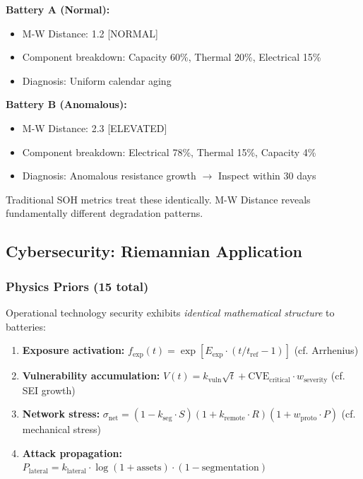 \documentclass[11pt,a4paper]{article}
\begin{document}
\textbf{Battery A (Normal):}
\begin{itemize}
\item M-W Distance: 1.2 [NORMAL]
\item Component breakdown: Capacity 60\%, Thermal 20\%, Electrical 15\%
\item Diagnosis: Uniform calendar aging
\end{itemize}

\textbf{Battery B (Anomalous):}
\begin{itemize}
\item M-W Distance: 2.3 [ELEVATED]
\item Component breakdown: Electrical 78\%, Thermal 15\%, Capacity 4\%
\item Diagnosis: Anomalous resistance growth $\to$ Inspect within 30 days
\end{itemize}

Traditional SOH metrics treat these identically. M-W Distance reveals fundamentally different degradation patterns.

\subsection{Cybersecurity: Riemannian Application}

\subsubsection{Physics Priors (15 total)}

Operational technology security exhibits \emph{identical mathematical structure} to batteries:

\begin{enumerate}
\item \textbf{Exposure activation:} $f_{\text{exp}}(t) = \exp[E_{\text{exp}} \cdot (t/t_{\text{ref}} - 1)]$ (cf. Arrhenius)
\item \textbf{Vulnerability accumulation:} $V(t) = k_{\text{vuln}}\sqrt{t} + \text{CVE}_{\text{critical}} \cdot w_{\text{severity}}$ (cf. SEI growth)
\item \textbf{Network stress:} $\sigma_{\text{net}} = (1-k_{\text{seg}}\cdot S)(1+k_{\text{remote}}\cdot R)(1+w_{\text{proto}}\cdot P)$ (cf. mechanical stress)
\item \textbf{Attack propagation:} $P_{\text{lateral}} = k_{\text{lateral}} \cdot \log(1 + \text{assets}) \cdot (1 - \text{segmentation})$
\end{enumerate}
\end{document}
